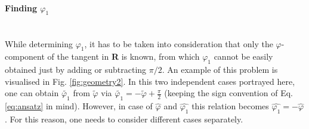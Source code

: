 \paragraph{Finding $\varphi_1$}\mbox{}\\
While determining $\varphi_1$, it has to be taken into consideration that only the $\varphi$-component of the tangent in \textbf{R} is known, from which $\varphi_1$ cannot be easily obtained just by adding or subtracting $\pi/2$. An example of this problem is visualised in Fig. \ref{fig:geometry2}. In this two independent cases portrayed here, one can obtain $\tilde{\varphi_1}$ from $\tilde{\varphi}$ via $\tilde{\varphi_1}=-\tilde{\varphi}+\frac{\pi}{2}$ (keeping the sign convention of Eq. \ref{eq:ansatz} in mind). However, in case of $\hat{\varphi}$ and $\hat{\varphi_1}$ this relation becomes $\hat{\varphi_1} = -\hat{\varphi}$. For this reason, one needs to consider different cases separately.
